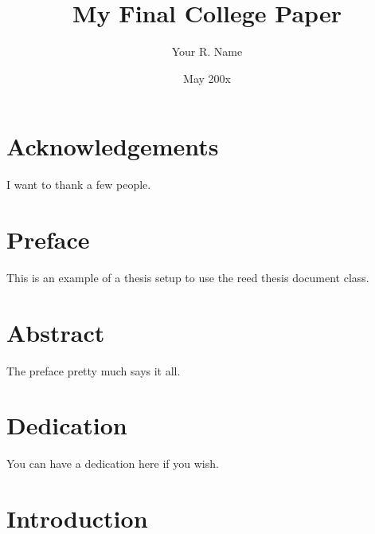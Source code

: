 \documentclass[12pt,twoside]{reedthesis}
\title{My Final College Paper}
\author{Your R. Name}
\date{May 200x}
\renewcommand{\'}{^{'}}
\begin{document}
  \maketitle
  \frontmatter %
  \pagestyle{empty} %

    \chapter*{Acknowledgements}
	I want to thank a few people.

    \chapter*{Preface}
	This is an example of a thesis setup to use the reed thesis document class.

    \chapter*{Abstract}
	The preface pretty much says it all.
	
    \chapter*{Dedication}
	You can have a dedication here if you wish.

  \mainmatter %
  \pagestyle{fancyplain} %


    \chapter*{Introduction}

	
\end{document}
